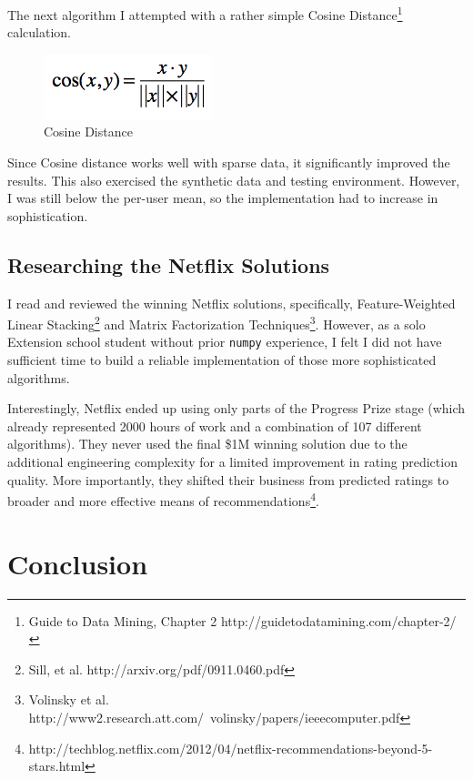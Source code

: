 \documentclass[11pt, oneside]{article}   	%
\begin{document}
The next algorithm I attempted with a rather simple Cosine Distance\footnote{Guide to Data Mining, Chapter 2 http://guidetodatamining.com/chapter-2/}
calculation.
\begin{figure}[h!]
\centering
\includegraphics[scale=0.8]{cosine}
\caption{Cosine Distance}
\end{figure}

Since Cosine distance works well with sparse data, it significantly improved the results. This also exercised the synthetic data and testing environment. However, I was still below the per-user mean, so the implementation had to increase in sophistication.

\subsection*{Researching the Netflix Solutions}

I read and reviewed the winning Netflix solutions, specifically, Feature-Weighted Linear Stacking\footnote{Sill, et al. http://arxiv.org/pdf/0911.0460.pdf} and Matrix Factorization Techniques\footnote{Volinsky et al. http://www2.research.att.com/~volinsky/papers/ieeecomputer.pdf}. However, as a solo Extension school student without prior \texttt{numpy} experience, I felt I did not have sufficient time to build a reliable implementation of those more sophisticated algorithms. 

Interestingly, Netflix ended up using only parts of the Progress Prize stage (which already represented 2000 hours of work and a combination of 107 different algorithms). They never used the final \$1M winning solution due to the additional engineering complexity for a limited improvement in rating prediction quality. More importantly, they shifted their business from predicted ratings to broader and more effective means of recommendations\footnote{http://techblog.netflix.com/2012/04/netflix-recommendations-beyond-5-stars.html}.

\section*{Conclusion}
\end{document}
